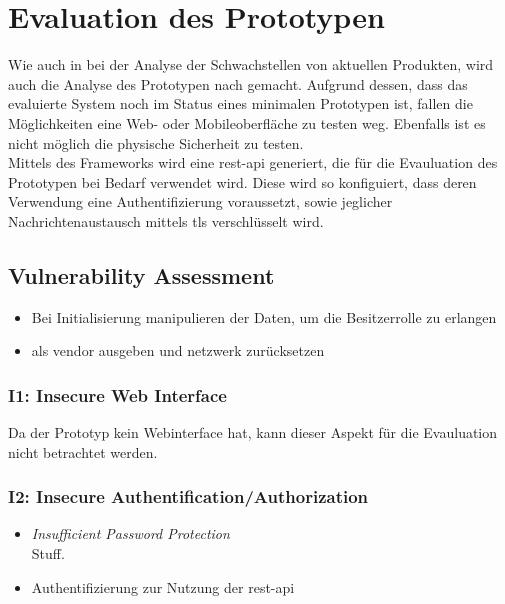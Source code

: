 \section{Evaluation des Prototypen}
\label{sec:evaluation}
    Wie auch in  bei der Analyse der Schwachstellen von aktuellen Produkten, wird auch die Analyse des Prototypen nach \cite{Miessler} gemacht. 
    Aufgrund dessen, dass das evaluierte System noch im Status eines minimalen Prototypen ist, fallen die Möglichkeiten eine Web- oder Mobileoberfläche zu testen weg. 
    Ebenfalls ist es nicht möglich die physische Sicherheit zu testen.
    \medskip\\
    Mittels des Frameworks wird eine \gls{rest}-\gls{api} generiert, die für die Evauluation des Prototypen bei Bedarf verwendet wird. 
    Diese wird so konfiguiert, dass deren Verwendung eine Authentifizierung voraussetzt, sowie jeglicher Nachrichtenaustausch mittels \gls{tls} verschlüsselt wird.

    \subsection{Vulnerability Assessment}
        \begin{itemize}[noitemsep]
            \item Bei Initialisierung manipulieren der Daten, um die Besitzerrolle zu erlangen
            \item als vendor ausgeben und netzwerk zurücksetzen
        \end{itemize}
    
        \subsubsection*{I1: Insecure Web Interface}
            Da der Prototyp kein Webinterface hat, kann dieser Aspekt für die Evauluation nicht betrachtet werden.
           
        \subsubsection*{I2: Insecure Authentification/Authorization}
            \begin{itemize}[leftmargin=0cm,label={}]
                \item \emph{Insufficient Password Protection}\label{vuln:prototype_pwdprot}\\
        	        Stuff.
    	        \item Authentifizierung zur Nutzung der \gls{rest}-\gls{api}
            \end{itemize}
            
